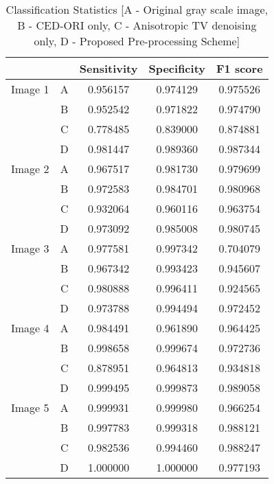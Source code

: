 \begin{definition}
	\begin{table}[!h]
		\renewcommand{\arraystretch}{1.3}
		\caption{Classification Statistics [A - Original gray scale image, B - CED-ORI only, C - Anisotropic TV denoising only, D - Proposed Pre-processing Scheme]}
		\label{tab:class_stats}
		\centering
		\begin{tabular}{|c|c|c|c|c|}
			\hline
			&   & Sensitivity & Specificity & F1 score\\ \hline
			Image 1  	& A & 0.956157 & 0.974129 & 0.975526 \\
			& B & 0.952542 & 0.971822 & 0.974790 \\
			& C & 0.778485 & 0.839000 & 0.874881 \\
			& D & 0.981447 & 0.989360 & 0.987344 \\ \hline
			
			Image 2     	& A & 0.967517 & 0.981730 & 0.979699 \\
			& B & 0.972583 & 0.984701 & 0.980968 \\
			& C & 0.932064 & 0.960116 & 0.963754 \\
			& D & 0.973092 & 0.985008 & 0.980745 \\ \hline
			
			Image 3     	& A & 0.977581 & 0.997342 & 0.704079 \\
			& B & 0.967342 & 0.993423 & 0.945607 \\
			& C & 0.980888 & 0.996411 & 0.924565 \\
			& D & 0.973788 & 0.994494 & 0.972452 \\ \hline
			
			Image 4     	& A & 0.984491 & 0.961890 & 0.964425 \\
			& B & 0.998658 & 0.999674 & 0.972736 \\
			& C & 0.878951 & 0.964813 & 0.934818 \\
			& D & 0.999495 & 0.999873 & 0.989058 \\ \hline
			
			Image 5    	& A & 0.999931 & 0.999980 & 0.966254 \\
			& B & 0.997783 & 0.999318 & 0.988121 \\
			& C & 0.982536 & 0.994460 & 0.988247 \\
			& D & 1.000000 & 1.000000 & 0.977193 \\ \hline
		\end{tabular}
	\end{table}
\end{definition}

